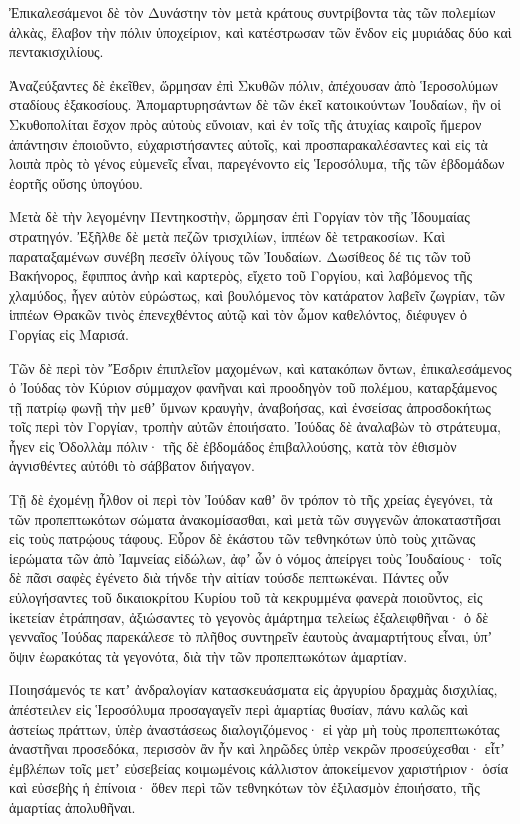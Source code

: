 {Ἐπικαλεσάμενοι δὲ τὸν Δυνάστην τὸν μετὰ κράτους συντρίβοντα τὰς τῶν πολεμίων ἀλκὰς, ἔλαβον τὴν πόλιν ὑποχείριον, καὶ κατέστρωσαν τῶν ἔνδον εἰς μυριάδας δύο καὶ πεντακισχιλίους.
\par }{\PP {}Ἀναζεύξαντες δὲ ἐκεῖθεν, ὥρμησαν ἐπὶ Σκυθῶν πόλιν, ἀπέχουσαν ἀπὸ Ἱεροσολύμων σταδίους ἑξακοσίους.
Ἀπομαρτυρησάντων δὲ τῶν ἐκεῖ κατοικούντων Ἰουδαίων, ἣν οἱ Σκυθοπολίται ἔσχον πρὸς αὐτοὺς εὔνοιαν, καὶ ἐν τοῖς τῆς ἀτυχίας καιροῖς ἥμερον ἀπάντησιν ἐποιοῦντο,
εὐχαριστήσαντες αὐτοῖς, καὶ προσπαρακαλέσαντες καὶ εἰς τὰ λοιπὰ πρὸς τὸ γένος εὐμενεῖς εἶναι, παρεγένοντο εἰς Ἱεροσόλυμα, τῆς τῶν ἑβδομάδων ἑορτῆς οὕσης ὑπογύου.
\par }{\PP {}Μετὰ δὲ τὴν λεγομένην Πεντηκοστὴν, ὥρμησαν ἐπὶ Γοργίαν τὸν τῆς Ἰδουμαίας στρατηγόν.
Ἐξῆλθε δὲ μετὰ πεζῶν τρισχιλίων, ἱππέων δὲ τετρακοσίων.
Καὶ παραταξαμένων συνέβη πεσεῖν ὀλίγους τῶν Ἰουδαίων.
Δωσίθεος δέ τις τῶν τοῦ Βακήνορος, ἔφιππος ἀνὴρ καὶ καρτερὸς, εἴχετο τοῦ Γοργίου, καὶ λαβόμενος τῆς χλαμύδος, ἦγεν αὐτὸν εὐρώστως, καὶ βουλόμενος τὸν κατάρατον λαβεῖν ζωγρίαν, τῶν ἱππέων Θρακῶν τινὸς ἐπενεχθέντος αὐτῷ καὶ τὸν ὦμον καθελόντος, διέφυγεν ὁ Γοργίας εἰς Μαρισά.
\par }{\PP {}Τῶν δὲ περὶ τὸν Ἔσδριν ἐπιπλεῖον μαχομένων, καὶ κατακόπων ὄντων, ἐπικαλεσάμενος ὁ Ἰούδας τὸν Κύριον σύμμαχον φανῆναι καὶ προοδηγὸν τοῦ πολέμου,
καταρξάμενος τῇ πατρίῳ φωνῇ τὴν μεθʼ ὕμνων κραυγὴν, ἀναβοήσας, καὶ ἐνσείσας ἀπροσδοκήτως τοῖς περὶ τὸν Γοργίαν, τροπὴν αὐτῶν ἐποιήσατο.
Ἰούδας δὲ ἀναλαβὼν τὸ στράτευμα, ἦγεν εἰς Ὀδολλὰμ πόλιν· τῆς δὲ ἑβδομάδος ἐπιβαλλούσης, κατὰ τὸν ἐθισμὸν ἁγνισθέντες αὐτόθι τὸ σάββατον διήγαγον.
\par }{\PP {}Τῇ δὲ ἐχομένῃ ἦλθον οἱ περὶ τὸν Ἰούδαν καθʼ ὃν τρόπον τὸ τῆς χρείας ἐγεγόνει, τὰ τῶν προπεπτωκότων σώματα ἀνακομίσασθαι, καὶ μετὰ τῶν συγγενῶν ἀποκαταστῆσαι εἰς τοὺς πατρῴους τάφους.
Εὗρον δὲ ἑκάστου τῶν τεθνηκότων ὑπὸ τοὺς χιτῶνας ἱερώματα τῶν ἀπὸ Ἰαμνείας εἰδώλων, ἀφʼ ὧν ὁ νόμος ἀπείργει τοὺς Ἰουδαίους· τοῖς δὲ πᾶσι σαφὲς ἐγένετο διὰ τήνδε τὴν αἰτίαν τούσδε πεπτωκέναι.
Πάντες οὖν εὐλογήσαντες τοῦ δικαιοκρίτου Κυρίου τοῦ τὰ κεκρυμμένα φανερὰ ποιοῦντος,
εἰς ἱκετείαν ἐτράπησαν, ἀξιώσαντες τὸ γεγονὸς ἁμάρτημα τελείως ἐξαλειφθῆναι· ὁ δὲ γενναῖος Ἰούδας παρεκάλεσε τὸ πλῆθος συντηρεῖν ἑαυτοὺς ἀναμαρτήτους εἶναι, ὑπʼ ὄψιν ἑωρακότας τὰ γεγονότα, διὰ τὴν τῶν προπεπτωκότων ἁμαρτίαν.
\par }{\PP {}Ποιησάμενός τε κατʼ ἀνδραλογίαν κατασκευάσματα εἰς ἀργυρίου δραχμὰς δισχιλίας, ἀπέστειλεν εἰς Ἱεροσόλυμα προσαγαγεῖν περὶ ἁμαρτίας θυσίαν, πάνυ καλῶς καὶ ἀστείως πράττων, ὑπὲρ ἀναστάσεως διαλογιζόμενος·
εἰ γὰρ μὴ τοὺς προπεπτωκότας ἀναστῆναι προσεδόκα, περισσὸν ἂν ἦν καὶ ληρῶδες ὑπὲρ νεκρῶν προσεύχεσθαι·
εἶτʼ ἐμβλέπων τοῖς μετʼ εὐσεβείας κοιμωμένοις κάλλιστον ἀποκείμενον χαριστήριον· ὁσία καὶ εὐσεβὴς ἡ ἐπίνοια· ὅθεν περὶ τῶν τεθνηκότων τὸν ἐξιλασμὸν ἐποιήσατο, τῆς ἁμαρτίας ἀπολυθῆναι.

}
